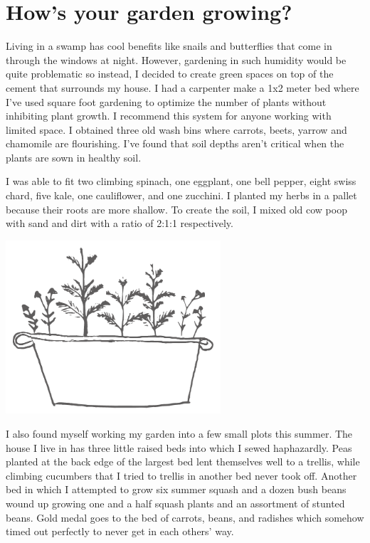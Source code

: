 \documentclass[10pt,a6paper,footinclude=false,firstfoot=false,headinclude=true,open=any,DIV=6]{scrbook} %
\begin{document}
\chapter{How's your garden growing?}

Living in a swamp has cool benefits like snails and butterflies that come in through the windows at night. However, gardening in such humidity would be quite problematic so instead, I decided to create green spaces on top of the cement that surrounds my house. I had a carpenter make a 1x2 meter bed where I've used square foot gardening to optimize the number of plants without inhibiting plant growth. I recommend this system for anyone working with limited space. I obtained three old wash bins where carrots, beets, yarrow and chamomile are flourishing. I've found that soil depths aren't critical when the plants are sown in healthy soil.

I was able to fit two climbing spinach, one eggplant, one bell pepper, eight swiss chard, five kale, one cauliflower, and one zucchini.
I planted my herbs in a pallet because their roots are more shallow.
To create the soil, I mixed old cow poop with sand and dirt with a ratio of 2:1:1 respectively. 

\begin{center}
\noindent\includegraphics[width=0.6\textwidth]{MichGardenImproved.png}
\end{center}
\vspace{1ex}

I also found myself working my garden into a few small plots this summer. The house I live in has three little raised beds into which I sewed haphazardly. Peas planted at the back edge of the largest bed lent themselves well to a trellis, while climbing cucumbers that I tried to trellis in another bed never took off. Another bed in which I attempted to grow six summer squash and a dozen bush beans wound up growing one and a half squash plants and an assortment of stunted beans. Gold medal goes to the bed of carrots, beans, and radishes which somehow timed out perfectly to never get in each others' way. 
\end{document}
